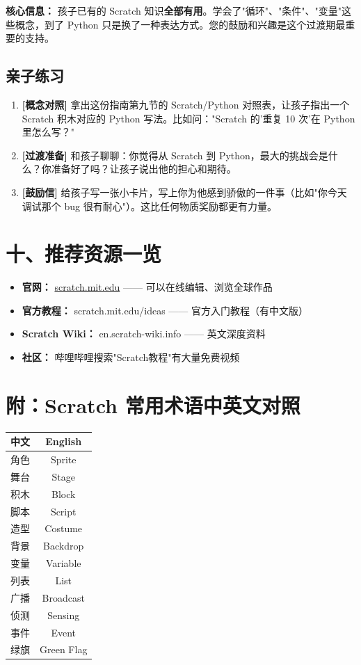 \documentclass[a4paper,12pt]{ctexart}
\begin{document}
\textbf{核心信息：} 孩子已有的 Scratch 知识\textbf{全部有用}。学会了"循环"、"条件"、"变量"这些概念，到了 Python 只是换了一种表达方式。您的鼓励和兴趣是这个过渡期最重要的支持。

\subsection*{亲子练习}

\begin{enumerate}
  \item \textbf{[概念对照]} 拿出这份指南第九节的 Scratch/Python 对照表，让孩子指出一个 Scratch 积木对应的 Python 写法。比如问："Scratch 的'重复 10 次'在 Python 里怎么写？"
  \item \textbf{[过渡准备]} 和孩子聊聊：你觉得从 Scratch 到 Python，最大的挑战会是什么？你准备好了吗？让孩子说出他的担心和期待。
  \item \textbf{[鼓励信]} 给孩子写一张小卡片，写上你为他感到骄傲的一件事（比如"你今天调试那个 bug 很有耐心"）。这比任何物质奖励都更有力量。
\end{enumerate}

\section*{十、推荐资源一览}

\begin{itemize}
  \item \textbf{官网：} \href{https://scratch.mit.edu}{scratch.mit.edu} —— 可以在线编辑、浏览全球作品
  \item \textbf{官方教程：} scratch.mit.edu/ideas —— 官方入门教程（有中文版）
  \item \textbf{Scratch Wiki：} en.scratch-wiki.info —— 英文深度资料
  \item \textbf{社区：} 哔哩哔哩搜索"Scratch教程"有大量免费视频
\end{itemize}

\section*{附：Scratch 常用术语中英文对照}

\begin{center}
\begin{tabular}{|c|c|}
\hline
\textbf{中文} & \textbf{English} \\ \hline
角色 & Sprite \\ \hline
舞台 & Stage \\ \hline
积木 & Block \\ \hline
脚本 & Script \\ \hline
造型 & Costume \\ \hline
背景 & Backdrop \\ \hline
变量 & Variable \\ \hline
列表 & List \\ \hline
广播 & Broadcast \\ \hline
侦测 & Sensing \\ \hline
事件 & Event \\ \hline
绿旗 & Green Flag \\ \hline
\end{tabular}
\end{center}
\end{document}
